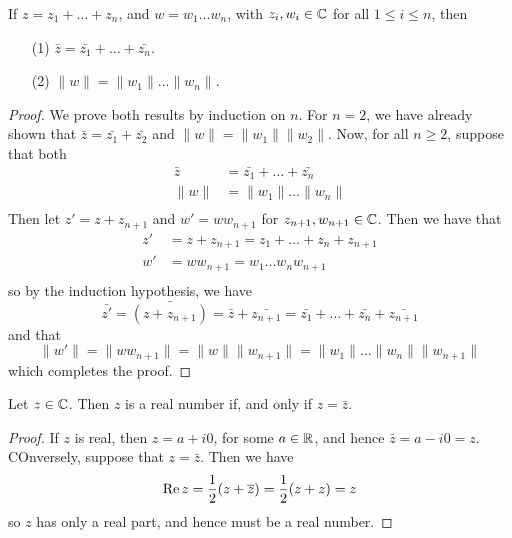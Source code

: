 \begin{corollary}
    If $z=z_1+\dots+z_n$, and $w=w_1 \dots w_n$, with $z_i,w_i \in \mathbb{C}$ for all
    $1 \leq i \leq n$, then
    \begin{enumerate}
        \item[(1)] $\bar{z}=\bar{z_1}+\dots+\bar{z_n}$.

        \item[(2)] $\|w\|=\|w_1\| \dots \|w_n\|$.
    \end{enumerate}
\end{corollary}
\begin{proof}
    We prove both results by induction on $n$. For  $n=2$, we have already shown
    that  $\bar{z}=\bar{z_1}+\bar{z_2}$ and $\|w\|=\|w_1\|\|w_2\|$. Now, for
    all $n \geq 2$, suppose that both
    \begin{align*}
        \bar{z} &=  \bar{z_1}+\dots+\bar{z_n}   \\
        \|w\|   &=  \|w_1\| \dots \|w_n\|   \\
    \end{align*}
    Then let $z'=z+z_{n+1}$ and $w'=ww_{n+1}$ for $z_{n+1},w_{n+1} \in \mathbb{C}$. Then
    we have that
    \begin{align*}
        z'  &= z+z_{n+1}    = z_1+\dots+z_n+z_{n+1}   \\
        w'  &=  ww_{n+1}    =   w_1 \dots w_n w_{n+1}   \\
    \end{align*}
    so by the induction hypothesis, we have
    \begin{equation*}
        \bar{z'}=\bar{(z+z_{n+1})}=\bar{z}+\bar{z_{n+1}}=\bar{z_1}+\dots+\bar{z_n}+
        \bar{z_{n+1}}
    \end{equation*}
    and that
    \begin{equation*}
        \|w'\|=\|ww_{n+1}\|=\|w\|\|w_{n+1}\|=\|w_1\| \dots \|w_n\| \|w_{n+1}\|
    \end{equation*}
    which completes the proof.
\end{proof}

\begin{lemma}\label{1.1.4}
    Let $z \in \mathbb{C}$. Then $z$ is a real number if, and only if  $z=\bar{z}$.
\end{lemma}
\begin{proof}
    If $z$ is real, then  $z=a+i0$, for some $a \in \mathbb{R}$, and hence
    $\bar{z}=a-i0=z$. COnversely, suppose that $z=\bar{z}$. Then we have
    \begin{equation*}
        \operatorname{Re}{z}=\frac{1}{2}(z+\overline{z})=\frac{1}{2}(z+z)=z
    \end{equation*}
    so $z$ has only a real part, and hence must be a real number.
\end{proof}

